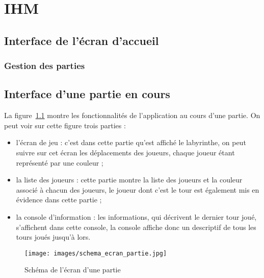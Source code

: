 \chapter{IHM}


\section{Interface de l'écran d'accueil}


\subsection{Gestion des parties}


\section{Interface d'une partie en cours}
La figure~\ref{fig:ecran_partie} montre les fonctionnalités de l'application au cours d'une partie. On peut voir sur cette figure trois parties :
\begin{itemize}
	\item l'écran de jeu : c'est dans cette partie qu'est affiché le labyrinthe, on peut suivre sur cet écran les déplacements des joueurs, chaque joueur étant représenté par une couleur ;
	\item la liste des joueurs : cette partie montre la liste des joueurs et la couleur associé à chacun des joueurs, le joueur dont c'est le tour est également mis en évidence dans cette partie ;
	\item la console d'information : les informations, qui décrivent le dernier tour joué, s'affichent dans cette console, la console affiche donc un descriptif de tous les tours joués jusqu'à lors.
\end{itemize}
\begin{figure}[h]
	\centering
	\texttt{[image: images/schema\_ecran\_partie.jpg]}
	\caption{Schéma de l'écran d'une partie}
	\label{fig:ecran_partie}
\end{figure}

